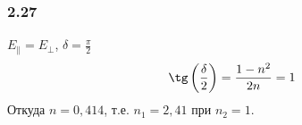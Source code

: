 \subsubsection*{2.27}
$E_{\|} = E_{\bot}$, $\delta = \frac{\pi}{2}$\\
\begin{equation*}
	\tg\left( \frac{\delta}{2}\right) = \frac{1-n^2}{2n} = 1
\end{equation*}
Откуда $n = 0,414$, т.е. $n_1 = 2,41$ при $n_2=1$.
